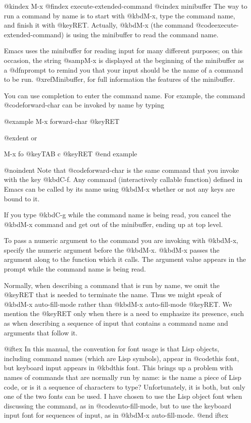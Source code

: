 {{{{{@kindex M-x
@findex execute-extended-command
@cindex minibuffer
  The way to run a command by name is to start with @kbd{M-x}, type the
command name, and finish it with @key{RET}.  Actually, @kbd{M-x} (the command
@code{execute-extended-command}) is using the minibuffer to read the
command name.

  Emacs uses the minibuffer for reading input for many different purposes;
on this occasion, the string @samp{M-x} is displayed at the beginning of
the minibuffer as a @dfn{prompt} to remind you that your input should be
the name of a command to be run.  @xref{Minibuffer}, for full information
the features of the minibuffer.

  You can use completion to enter the command name.  For example, the
command @code{forward-char} can be invoked by name by typing

@example
M-x forward-char @key{RET}

@exdent or

M-x fo @key{TAB} c @key{RET}
@end example

@noindent
Note that @code{forward-char} is the same command that you invoke with
the key @kbd{C-f}.  Any command (interactively callable function) defined
in Emacs can be called by its name using @kbd{M-x} whether or not any
keys are bound to it.

  If you type @kbd{C-g} while the command name is being read, you cancel
the @kbd{M-x} command and get out of the minibuffer, ending up at top level.

  To pass a numeric argument to the command you are invoking with
@kbd{M-x}, specify the numeric argument before the @kbd{M-x}.  @kbd{M-x}
passes the argument along to the function which it calls.  The argument
value appears in the prompt while the command name is being read.

  Normally, when describing a command that is run by name, we omit the
@key{RET} that is needed to terminate the name.  Thus we might speak of
@kbd{M-x auto-fill-mode} rather than @kbd{M-x auto-fill-mode @key{RET}}.
We mention the @key{RET} only when there is a need to emphasize its
presence, such as when describing a sequence of input that contains a
command name and arguments that follow it.

@iftex
  In this manual, the convention for font usage is that Lisp objects,
including command names (which are Lisp symbols), appear in @code{this
font}, but keyboard input appears in @kbd{this font}.  This brings up
a problem with names of commands that are normally run by name: is the
name a piece of Lisp code, or is it a sequence of characters to type?
Unfortunately, it is both, but only one of the two fonts can be used.
I have chosen to use the Lisp object font when discussing the command,
as in @code{auto-fill-mode}, but to use the keyboard input font for
sequences of input, as in @kbd{M-x auto-fill-mode}.
@end iftex

}}}}}
